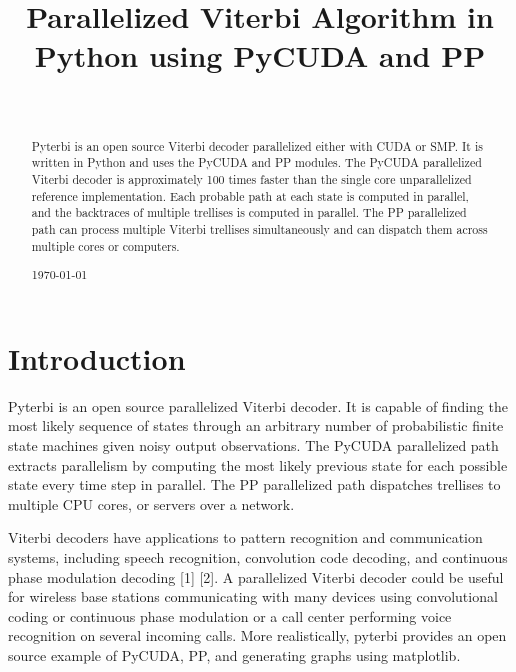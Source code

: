 \documentclass[journal,onecolumn]{IEEEtran}
\begin{document}
\title{Parallelized Viterbi Algorithm in Python using PyCUDA and PP}
\author{\\
    }


\maketitle

\begin{abstract}
Pyterbi is an open source Viterbi decoder parallelized either with CUDA or SMP. It is written in Python and uses the PyCUDA and PP modules. The PyCUDA parallelized Viterbi decoder is approximately 100 times faster than the single core unparallelized reference implementation. Each probable path at each state is computed in parallel, and the backtraces of multiple trellises is computed in parallel. The PP parallelized path can process multiple Viterbi trellises simultaneously and can dispatch them across multiple cores or computers.  

\hfill \today 
\end{abstract}

\section{Introduction}
Pyterbi is an open source parallelized Viterbi decoder. It is capable of finding the most likely sequence of states through an arbitrary number of probabilistic finite state machines given noisy output observations. The PyCUDA parallelized path extracts parallelism by computing the most likely previous state for each possible state every time step in parallel. The PP parallelized path dispatches trellises to multiple CPU cores, or servers over a network.


Viterbi decoders have applications to pattern recognition and communication systems, including speech recognition, convolution code decoding, and continuous phase modulation decoding [1] [2]. A parallelized Viterbi decoder could be useful for wireless base stations communicating with many devices using convolutional coding or continuous phase modulation or a call center performing voice recognition on several incoming calls. More realistically, pyterbi provides an open source example of PyCUDA, PP, and generating graphs using matplotlib.   
\end{document}
